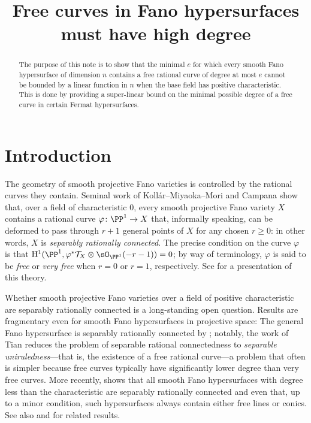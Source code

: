 
\title{Free curves in Fano hypersurfaces must have high degree}
\begin{abstract}
The purpose of this note is to show that the minimal \(e\) for which every
smooth Fano hypersurface of dimension \(n\) contains a free rational curve of
degree at most \(e\) cannot be bounded by a linear function in \(n\) when
the base field has positive characteristic. This is done by providing a
super-linear bound on the minimal possible degree of a free curve in certain
Fermat hypersurfaces.
\end{abstract}
\maketitle

\thispagestyle{empty}
\section*{Introduction}
The geometry of smooth projective Fano varieties is controlled by the rational
curves they contain. Seminal work \cite{KMM, Campana} of
Koll\'ar--Miyaoka--Mori and Campana show that, over a field of characteristic
\(0\), every smooth projective Fano variety \(X\) contains a rational curve
\(\varphi \colon \PP^1 \to X\) that, informally speaking, can be deformed to
pass through \(r+1\) general points of \(X\) for any chosen \(r \geq 0\): in
other words, \(X\) is \emph{separably rationally connected}. The precise
condition on the curve \(\varphi\) is that
\(\mathrm{H}^1(\PP^1,\varphi^*\mathcal{T}_X \otimes \sO_{\PP^1}(-r-1)) = 0\);
by way of terminology, \(\varphi\) is said to be \emph{free} or \emph{very
free} when \(r = 0\) or \(r = 1\), respectively. See \cite{Kollar,
Debarre:HDAG} for a presentation of this theory.

Whether smooth projective Fano varieties over a field of positive
characteristic are separably rationally connected is a long-standing open
question. Results are fragmentary even for smooth Fano hypersurfaces in
projective space: The general Fano hypersurface is separably rationally
connected by \cite{Zhu, CZ14, Tian, CR17}; notably, the work of Tian reduces
the problem of separable rational connectedness to \emph{separable
uniruledness}---that is, the existence of a free rational curve---a problem
that often is simpler because free curves typically have significantly lower
degree than very free curves. More recently, \cite[Theorems
3.10 and 3.24]{STZ} shows that all smooth Fano hypersurfaces with degree
less than the characteristic are separably rationally connected and even that,
up to a minor condition, such hypersurfaces always contain either free lines or
conics. See also \cite[Theorem 34]{LP} and \cite[Theorem 1.5]{BS} for related
results.

